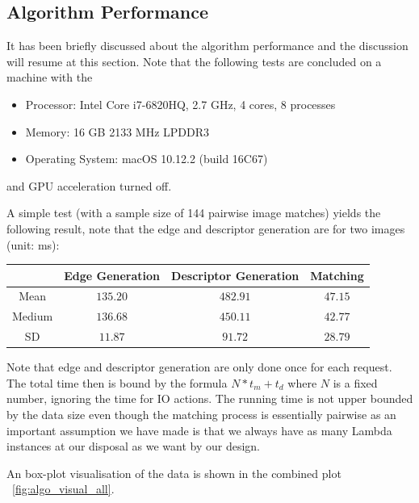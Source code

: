 \subsection{Algorithm Performance}
\label{sec:algorithm}

It has been briefly discussed about the algorithm performance and the discussion will resume at this section. Note that the following tests are concluded on a machine with the 

\begin{itemize}
	\item Processor: Intel Core i7-6820HQ, 2.7 GHz, 4 cores, 8 processes
	\item Memory: 16 GB 2133 MHz LPDDR3
	\item Operating System: macOS 10.12.2 (build 16C67)
\end{itemize}

and GPU acceleration turned off.

A simple test (with a sample size of 144 pairwise image matches) yields the following result, note that the edge and descriptor generation are for two images (unit: ms):

\begin{center}
\begin{tabular}{c|c c c}
        & Edge Generation & Descriptor Generation & Matching \\
\hline
Mean    & $135.20$       & $482.91$              & $47.15$  \\
Medium  & $136.68$       & $450.11$              & $42.77$  \\
SD      & $11.87$        & $91.72$               & $28.79$
\end{tabular}
\end{center}

Note that edge and descriptor generation are only done once for each request. The total time then is bound by the formula $N * t_m + t_d$ where $N$ is a fixed number, ignoring the time for IO actions. The running time is not upper bounded by the data size even though the matching process is essentially pairwise as an important assumption we have made is that we always have as many Lambda instances at our disposal as we want by our design.

An box-plot visualisation of the data is shown in the combined plot ~\ref{fig:algo_visual_all}.

